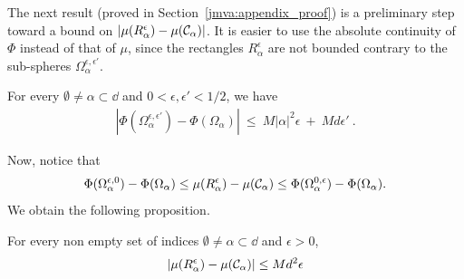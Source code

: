 The next result (proved in Section~\ref{jmva:appendix_proof}) is a preliminary step toward a bound on $|\mu(R_\alpha^\epsilon)-\mu(\mathcal{C}_\alpha)|$. It is easier to use the absolute continuity of $\Phi$ instead of that of $\mu$, since the rectangles $R_\alpha^\epsilon$ are not bounded contrary to the sub-spheres $\Omega_\alpha^{\epsilon, \epsilon'}$. 
\begin{lemma}
\label{jmva:lemma_simplex}
For every $\emptyset \neq \alpha \subset \dd$ and $0 < \epsilon, \epsilon' < 1/2$, we have 
\begin{align*}
|\Phi(\Omega_\alpha^{\epsilon, \epsilon'}) - \Phi(\Omega_\alpha)| ~\le~ M |\alpha|^2 \epsilon ~+~ M d \epsilon'~.
\end{align*}
\end{lemma}
\noindent
 Now, notice that %
$$
\Phi(\Omega_\alpha^{\epsilon, 0}) - \Phi(\Omega_\alpha) \le \mu(R_\alpha^\epsilon) - \mu(\mathcal{C}_\alpha) \le \Phi(\Omega_\alpha^{0, \epsilon}) - \Phi(\Omega_\alpha).
$$
We obtain the following proposition.
\begin{proposition}
\label{jmva:prop_simplex}
For every non empty set of indices $\emptyset \neq \alpha \subset \dd$ and $\epsilon > 0$,
\begin{align*}
|\mu(R_\alpha^\epsilon)-\mu(\mathcal{C}_\alpha)| \le M d^2 \epsilon
\end{align*}
\end{proposition}

